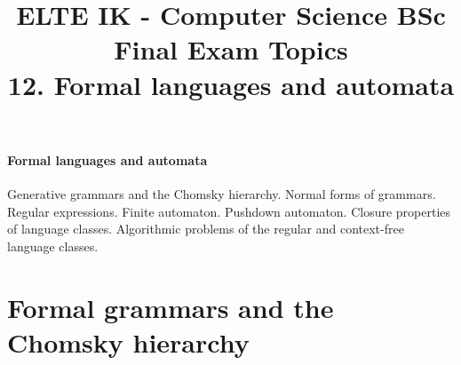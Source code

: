 \documentclass[margin=0px]{article}
\title{\textbf{{\Large ELTE IK - Computer Science BSc} \vspace{0.2cm} \\ {\huge Final Exam Topics}} \vspace{0.3cm} \\ 12. Formal languages and automata}
\author{}
\date{}
\newenvironment{tetel}[1]{\paragraph{#1 \\}}{}
\begin{document}
\maketitle

\begin{center}
\end{center}

\begin{tetel}{Formal languages and automata}
    Generative grammars and the Chomsky hierarchy. Normal forms of grammars. Regular expressions. Finite automaton. Pushdown automaton. Closure properties of language classes. Algorithmic problems of the regular and context-free language classes.
\end{tetel}

\section{Formal grammars and the Chomsky hierarchy}
\end{document}
